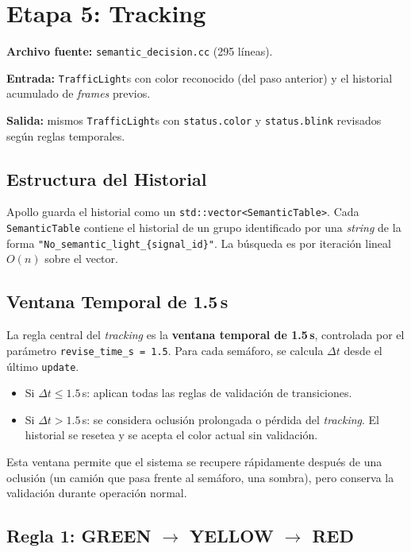 \section{Etapa 5: Tracking}
\label{sec:funcionamiento_tracking}

\textbf{Archivo fuente:} \texttt{semantic\_decision.cc} (295 líneas).

\textbf{Entrada:} \texttt{TrafficLight}s con color reconocido (del paso anterior) y el historial acumulado de \textit{frames} previos.

\textbf{Salida:} mismos \texttt{TrafficLight}s con \texttt{status.color} y \texttt{status.blink} revisados según reglas temporales.

\subsection{Estructura del Historial}

Apollo guarda el historial como un \texttt{std::vector<SemanticTable>}. Cada \texttt{SemanticTable} contiene el historial de un grupo identificado por una \textit{string} de la forma \texttt{"No\_semantic\_light\_\{signal\_id\}"}. La búsqueda es por iteración lineal $O(n)$ sobre el vector.

\subsection{Ventana Temporal de 1.5\,s}

La regla central del \textit{tracking} es la \textbf{ventana temporal de 1.5\,s}, controlada por el parámetro \texttt{revise\_time\_s = 1.5}. Para cada semáforo, se calcula $\Delta t$ desde el último \texttt{update}.

\begin{itemize}
    \item Si $\Delta t \leq 1.5$\,s: aplican todas las reglas de validación de transiciones.
    \item Si $\Delta t > 1.5$\,s: se considera oclusión prolongada o pérdida del \textit{tracking}. El historial se resetea y se acepta el color actual sin validación.
\end{itemize}

Esta ventana permite que el sistema se recupere rápidamente después de una oclusión (un camión que pasa frente al semáforo, una sombra), pero conserva la validación durante operación normal.

\subsection{Regla 1: GREEN $\to$ YELLOW $\to$ RED}

